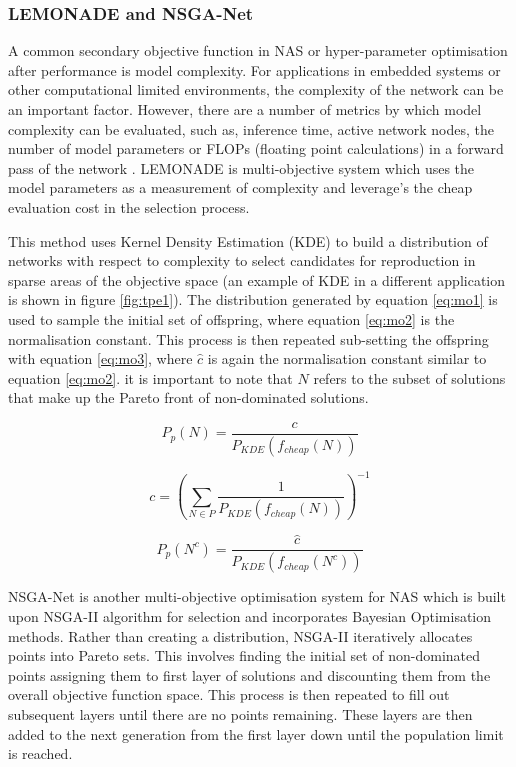 \newpage
		\subsubsection{LEMONADE and NSGA-Net}		

			A common secondary objective function in NAS or hyper-parameter optimisation after performance is model complexity. For applications in embedded systems or other computational limited environments, the complexity of the network can be an important factor. However, there are a number of metrics by which model complexity can be evaluated, such as, inference time, active network nodes, the number of model parameters or FLOPs (floating point calculations) in a forward pass of the network \cite{5}. 
			LEMONADE \cite{13} is multi-objective system which uses the model parameters as a measurement of complexity and leverage's the cheap evaluation cost in the selection process.

			This method uses Kernel Density Estimation (KDE) to build a distribution of networks with respect to complexity to select candidates for reproduction in sparse areas of the objective space (an example of KDE in a different application is shown in figure \ref{fig:tpe1}). The distribution generated by equation \ref{eq:mo1} is used to sample the initial set of offspring, where equation \ref{eq:mo2} is the normalisation constant. This process is then repeated sub-setting the offspring with equation \ref{eq:mo3}, where \(\hat{c}\) is again the normalisation constant similar to equation \ref{eq:mo2}. it is important to note that \(N\) refers to the subset of solutions that make up the Pareto front of non-dominated solutions.

			\begin{equation}\label{eq:mo1}
				P_p(N) = \frac{c}{P_{KDE}(f_{cheap}(N))}
			\end{equation}

			\begin{equation}\label{eq:mo2}
				c = \left(\sum_{N\in P}\frac{1}{P_{KDE}(f_{cheap}(N))}\right)^{-1}
			\end{equation}

			\begin{equation}\label{eq:mo3}
				P_p(N^c) = \frac{\hat{c}}{P_{KDE}(f_{cheap}(N^c))}
			\end{equation}


			NSGA-Net \cite{5} is another multi-objective optimisation system for NAS which is built upon NSGA-II algorithm\cite{42} for selection and incorporates Bayesian Optimisation methods. Rather than creating a distribution, NSGA-II iteratively allocates points into Pareto sets. This involves finding the initial set of non-dominated points assigning them to first layer of solutions and discounting them from the overall objective function space. This process is then repeated to fill out subsequent layers until there are no points remaining. These layers are then added to the next generation from the first layer down until the population limit is reached. 


